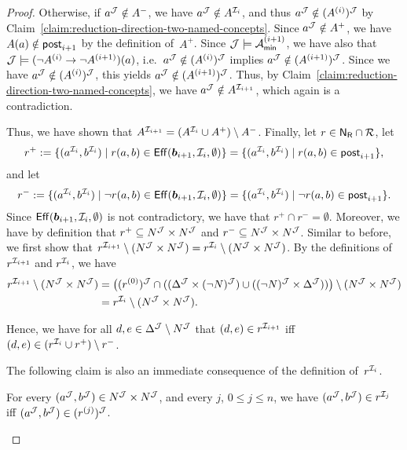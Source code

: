\begin{proof}
    Otherwise, if $a^\mathcal{J}\notin A^-$, we have $a^\mathcal{J}\notin A^{\mathcal{I}_i}$, and
    thus $a^\mathcal{J}\notin(A^{(i)})^\mathcal{J}$ by
    Claim~\ref{claim:reduction-direction-two-named-concepts}.  Since
    $a^\mathcal{J}\notin A^+$, we have $A(a)\notin\mathsf{post}_{i+1}$ by the definition
    of~$A^+$.  Since $\mathcal{J}\models\mathcal{A}_\mathsf{min}^{(i+1)}$, we have also that
    $\mathcal{J}\models(\lnot A^{(i)}\to\lnot A^{(i+1)})(a)$,
    i.e.~$a^\mathcal{J}\notin(A^{(i)})^\mathcal{J}$ implies $a^\mathcal{J}\notin(A^{(i+1)})^\mathcal{J}$.
    Since we have $a^\mathcal{J}\notin(A^{(i)})^\mathcal{J}$, this yields
    $a^\mathcal{J}\notin(A^{(i+1)})^\mathcal{J}$.  Thus, by
    Claim~\ref{claim:reduction-direction-two-named-concepts}, we have
    $a^\mathcal{J}\notin A^{\mathcal{I}_{i+1}}$, which again is a contradiction.

    Thus, we have shown that
    $A^{\mathcal{I}_{i+1}}=(A^{\mathcal{I}_i}\cup A^+)\setminus A^-$.
    Finally, let $r\in\mathsf{N_R}\cap\mathcal{R}$, let
    \[r^+:=\{(a^{\Imc_i},b^{\Imc_i})\mid r(a,b)\in\Eff(\bbf_{i+1},\Imc_i,\emptyset)\}%
        =\{(a^{\Imc_i},b^{\Imc_i})\mid r(a,b)\in\post_{i+1}\},\]
    and let
    \[r^-:=\{(a^{\Imc_i},b^{\Imc_i})\mid\lnot r(a,b)\in\Eff(\bbf_{i+1},\Imc_i,\emptyset)\}%
        =\{(a^{\Imc_i},b^{\Imc_i})\mid\lnot r(a,b)\in\post_{i+1}\}.\]
    Since $\operatorname{\mathsf{Eff}}(\boldsymbol b_{i+1},\mathcal{I}_i,\emptyset)$ is not contradictory, we have that
    $r^+\cap r^-=\emptyset$.  Moreover, we have by definition that
    $r^+\subseteq N^\mathcal{J}\times N^\mathcal{J}$ and $r^-\subseteq N^\mathcal{J}\times N^\mathcal{J}$.
    Similar to before, we first show that
    $r^{\mathcal{I}_{i+1}}\setminus(N^\mathcal{J}\times N^\mathcal{J})=r^{\mathcal{I}_i}\setminus(N^\mathcal{J}\times N^\mathcal{J})$.
    By the definitions of $r^{\mathcal{I}_{i+1}}$ and $r^{\mathcal{I}_i}$, we have
    \begin{align*}
        r^{\Imc_{i+1}}\setminus(N^\Jmc\times N^\Jmc)
        &=\bigl((r^{(0)})^\Jmc\cap((\Delta^\Jmc\times(\lnot N)^\Jmc)\cup%
            ((\lnot N)^\Jmc\times\Delta^\Jmc))\bigr)\setminus(N^\Jmc\times N^\Jmc)\\
        &=r^{\Imc_i}\setminus(N^\Jmc\times N^\Jmc).
    \end{align*}

    \noindent
    Hence, we have for all $d,e\in\Delta^\mathcal{J}\setminus N^\mathcal{J}$ that
    $(d,e)\in r^{\mathcal{I}_{i+1}}$ iff $(d,e)\in(r^{\mathcal{I}_i}\cup r^+)\setminus r^-$.

    The following claim is also an immediate consequence of the definition
    of~$r^{\mathcal{I}_i}$.

    \begin{claim}\label{claim:reduction-direction-two-named-roles}
        For every $(a^\mathcal{J},b^\mathcal{J})\in N^\mathcal{J}\times N^\mathcal{J}$, and every $j$,
        $0\le j\le n$, we have $(a^\mathcal{J},b^\mathcal{J})\in r^{\mathcal{I}_j}$ iff
        $(a^\mathcal{J},b^\mathcal{J})\in(r^{(j)})^\mathcal{J}$.
    \end{claim}


\end{proof}
